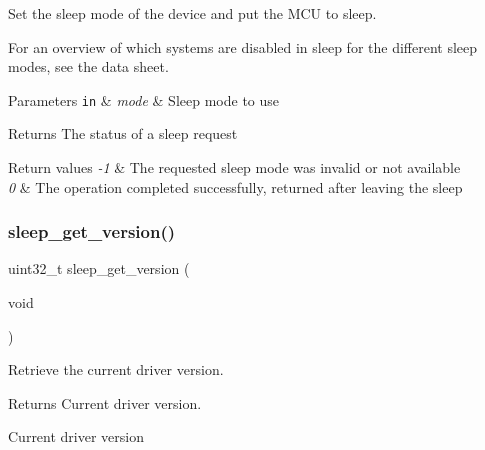 Set the sleep mode of the device and put the M\+CU to sleep. 

For an overview of which systems are disabled in sleep for the different sleep modes, see the data sheet.


\begin{DoxyParams}[1]{Parameters}
\mbox{\tt in}  & {\em mode} & Sleep mode to use\\
\hline
\end{DoxyParams}
\begin{DoxyReturn}{Returns}
The status of a sleep request 
\end{DoxyReturn}

\begin{DoxyRetVals}{Return values}
{\em -\/1} & The requested sleep mode was invalid or not available \\
\hline
{\em 0} & The operation completed successfully, returned after leaving the sleep \\
\hline
\end{DoxyRetVals}
\mbox{\label{group__doc__driver__hal__helper__sleep_gaab8a7b5dfa992a33c63e63ed98e4b105}} 
\subsubsection{\texorpdfstring{sleep\+\_\+get\+\_\+version()}{sleep\_get\_version()}}
{\footnotesize\ttfamily uint32\+\_\+t sleep\+\_\+get\+\_\+version (\begin{DoxyParamCaption}\item[{void}]{ }\end{DoxyParamCaption})}



Retrieve the current driver version. 

\begin{DoxyReturn}{Returns}
Current driver version.

Current driver version 
\end{DoxyReturn}
